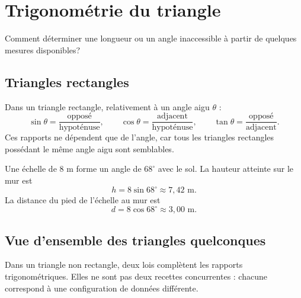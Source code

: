 \documentclass[12pt,a4paper,openany]{book}
\begin{document}
\chapter{Trigonométrie du triangle}

\begin{questionbox}
Comment déterminer une longueur ou un angle inaccessible à partir de quelques mesures disponibles?
\end{questionbox}

\section{Triangles rectangles}

Dans un triangle rectangle, relativement à un angle aigu $\theta$ :
\[
\sin\theta=\frac{\text{opposé}}{\text{hypoténuse}},
\qquad
\cos\theta=\frac{\text{adjacent}}{\text{hypoténuse}},
\qquad
\tan\theta=\frac{\text{opposé}}{\text{adjacent}}.
\]
Ces rapports ne dépendent que de l'angle, car tous les triangles rectangles possédant le même angle aigu sont semblables.

\begin{center}
\end{center}

\begin{examplebox}
Une échelle de $8$ m forme un angle de $68^\circ$ avec le sol. La hauteur atteinte sur le mur est
\[
h=8\sin68^\circ\approx7{,}42\text{ m}.
\]
La distance du pied de l'échelle au mur est
\[
d=8\cos68^\circ\approx3{,}00\text{ m}.
\]
\end{examplebox}

\section{Vue d'ensemble des triangles quelconques}

Dans un triangle non rectangle, deux lois complètent les rapports trigonométriques. Elles ne sont pas deux recettes concurrentes : chacune correspond à une configuration de données différente.
\end{document}
